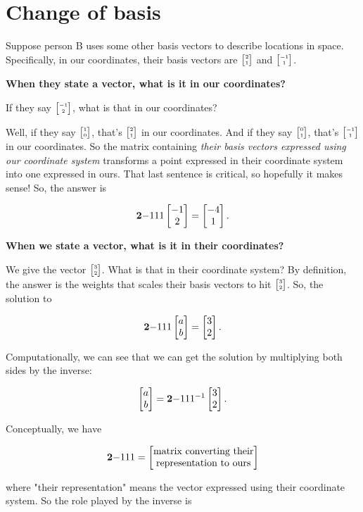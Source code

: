 \documentclass[12pt]{article}
\begin{document}

\section{ Change of basis}

Suppose person B uses some other basis vectors to describe locations in
space. Specifically, in our coordinates, their basis vectors are
$\tiny{\begin{bmatrix}2\\1\end{bmatrix}}$ and $\tiny{\begin{bmatrix}-1\\1\end{bmatrix}}$.


\textbf{When they state a vector, what is it in our coordinates?}

If they say $\tiny{\begin{bmatrix}-1\\2\end{bmatrix}}$, what is that in our coordinates?

Well, if they say $\tiny{\begin{bmatrix}1\\0\end{bmatrix}}$, that's $\tiny{\begin{bmatrix}2\\1\end{bmatrix}}$ in our coordinates. And
if they say $\tiny{\begin{bmatrix}0\\1\end{bmatrix}}$, that's $\tiny{\begin{bmatrix}-1\\1\end{bmatrix}}$ in our coordinates. So the
matrix containing \textit{their basis vectors expressed using our coordinate system}
transforms a point expressed in their coordinate system into one expressed in
ours. That last sentence is critical, so hopefully it makes sense! So, the answer is

$$
\mathbf{2}{-1}
    {1}{ 1} \begin{bmatrix}-1\\2\end{bmatrix} = \begin{bmatrix}-4\\1\end{bmatrix}.
$$


\textbf{When we state a vector, what is it in their coordinates?}

We give the vector $\tiny{\begin{bmatrix}3\\2\end{bmatrix}}$. What is that in their coordinate system? By
definition, the answer is the weights that scales their basis vectors to hit
$\tiny{\begin{bmatrix}3\\2\end{bmatrix}}$. So, the solution to

$$
\mathbf{2}{-1}
    {1}{1} \begin{bmatrix}a\\b\end{bmatrix} = \begin{bmatrix}3\\2\end{bmatrix}.
$$


Computationally, we can see that we can get the solution by multiplying both
sides by the inverse:

$$
\begin{bmatrix}a\\b\end{bmatrix} = \mathbf{2}{-1}
                  {1}{1}^{-1} \begin{bmatrix}3\\2\end{bmatrix}.
$$

Conceptually, we have

$$
\mathbf{2}{-1}
    {1}{1} =
\begin{bmatrix}\text{matrix converting their}\\\text{representation to ours} \\ \end{bmatrix}
$$

where "their representation" means the vector expressed using their coordinate
system. So the role played by the inverse is
\end{document}
